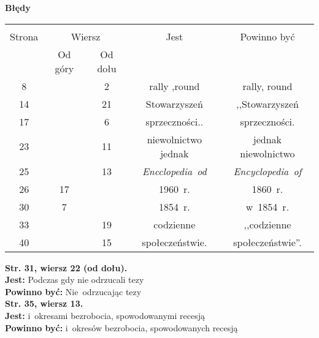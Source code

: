 \documentclass[a4paper,11pt]{article}  %
\newcommand{\spaceTwo}{2em}
\newcommand{\spaceFour}{0.5em}
\newcommand{\tb}{\textbf}
\newcommand{\noi}{\noindent}
\newcommand{\StrWg}[2]{\tb{Str. #1, wiersz #2.}}
\newcommand{\StrWd}[2]{\tb{Str. #1, wiersz #2 (od dołu).}}
\newcommand{\Jest}{\tb{Jest: }}
\newcommand{\Pow}{\tb{Powinno być: }}
\newcommand{\Center}[1]{\begin{center} #1 \end{center}}
\newcommand{\CenterTB}[1]{\Center{\tb{#1}}}
\begin{document}

\CenterTB{Błędy}
\begin{center}
  \begin{tabular}{|c|c|c|c|c|}
    \hline
    & \multicolumn{2}{c|}{} & & \\
    Strona & \multicolumn{2}{c|}{Wiersz}& Jest & Powinno być \\ \cline{2-3}
    & Od góry & Od dołu &  &  \\ \hline
    8   & &  2 & rally ,round & rally, round \\
    14  & & 21 & Stowarzyszeń & ,,Stowarzyszeń  %
    \\
    17  & &  6 & sprzeczności.. & sprzeczności. \\
    23  & & 11 & niewolnictwo jednak & jednak niewolnictwo \\
    25  & & 13 & \emph{Encclopedia~od} & \emph{Encyclopedia~of} \\
    26  & 17 & & 1960~r. & 1860~r. \\
    30  &  7 & & 1854~r. & w~1854~r. \\
    33  & & 19 & codzienne & ,,codzienne  %
    \\
    40  & & 15 & społeczeństwie. & społeczeństwie''. \\
    \hline
  \end{tabular}
\end{center}
\noi
\StrWd{31}{22} \\
\Jest Podczas gdy nie odrzucali tezy \\
\Pow  Nie~odrzucając tezy \\
\StrWg{35}{13} \\
\Jest i~okresami bezrobocia, spowodowanymi recesją \\
\Pow  i~okresów bezrobocia, spowodowanych recesją \\

\vspace{\spaceTwo}
\end{document}
